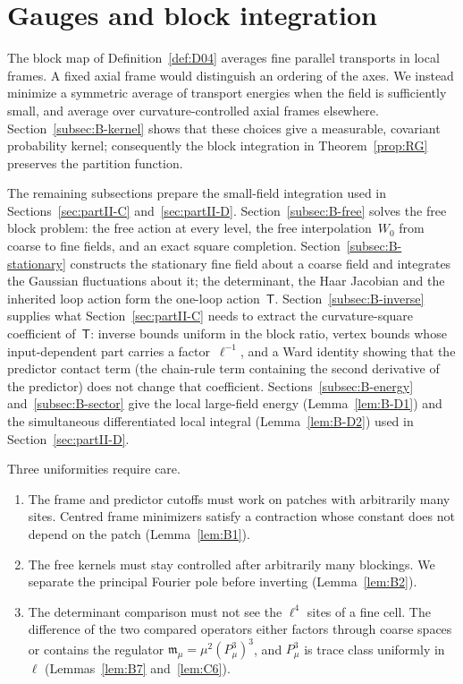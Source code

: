 \section{Gauges and block integration}\label{sec:partII-B}

The block map of Definition~\ref{def:D04} averages fine parallel transports in local frames. A fixed axial frame would distinguish an ordering of the axes. We instead minimize a symmetric average of transport energies when the field is sufficiently small, and average over curvature-controlled axial frames elsewhere. Section~\ref{subsec:B-kernel} shows that these choices give a measurable, covariant probability kernel; consequently the block integration in Theorem~\ref{prop:RG} preserves the partition function.

The remaining subsections prepare the small-field integration used in Sections~\ref{sec:partII-C} and~\ref{sec:partII-D}. Section~\ref{subsec:B-free} solves the free block problem: the free action at every level, the free interpolation~$W_0$ from coarse to fine fields, and an exact square completion. Section~\ref{subsec:B-stationary} constructs the stationary fine field about a coarse field and integrates the Gaussian fluctuations about it; the determinant, the Haar Jacobian and the inherited loop action form the one-loop action~$\mathsf T$. Section~\ref{subsec:B-inverse} supplies what Section~\ref{sec:partII-C} needs to extract the curvature-square coefficient of~$\mathsf T$: inverse bounds uniform in the block ratio, vertex bounds whose input-dependent part carries a factor~$\ell^{-1}$, and a Ward identity showing that the predictor contact term (the chain-rule term containing the second derivative of the predictor) does not change that coefficient. Sections~\ref{subsec:B-energy} and~\ref{subsec:B-sector} give the local large-field energy (Lemma~\ref{lem:B-D1}) and the simultaneous differentiated local integral (Lemma~\ref{lem:B-D2}) used in Section~\ref{sec:partII-D}.

Three uniformities require care.
\begin{enumerate}[label=(\roman*)]
\item The frame and predictor cutoffs must work on patches with arbitrarily many sites. Centred frame minimizers satisfy a contraction whose constant does not depend on the patch (Lemma~\ref{lem:B1}).
\item The free kernels must stay controlled after arbitrarily many blockings. We separate the principal Fourier pole before inverting (Lemma~\ref{lem:B2}).
\item The determinant comparison must not see the $\ell^4$ sites of a fine cell. The difference of the two compared operators either factors through coarse spaces or contains the regulator $\mathfrak m_\mu=\mu^2(P_\mu^3)^3$, and $P_\mu^3$ is trace class uniformly in~$\ell$ (Lemmas~\ref{lem:B7} and~\ref{lem:C6}).
\end{enumerate}

